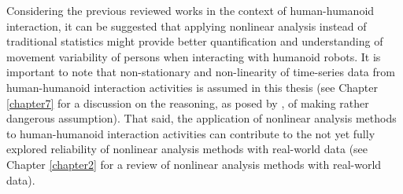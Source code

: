 Considering the previous reviewed works in the context 
of human-humanoid interaction, it can be suggested that applying 
nonlinear analysis instead of traditional statistics 
might provide better quantification and understanding
of movement variability of persons when interacting 
with humanoid robots.
It is important to note that non-stationary and non-linearity 
of time-series data from human-humanoid interaction
activities is assumed in this thesis  
(see Chapter \ref{chapter7} for a discussion
on the reasoning, as posed by \citep{schreiber2000},
of making rather dangerous assumption).
That said, the application of nonlinear analysis methods 
to human-humanoid interaction activities can contribute 
to the not yet fully explored reliability of 
nonlinear analysis methods with real-world data 
(see Chapter \ref{chapter2} for a review of 
nonlinear analysis methods with real-world data).

